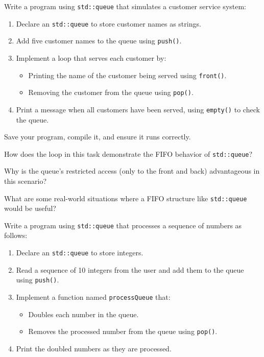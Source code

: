 \begin{challenge}
    \begin{task}
        Write a program using \texttt{std::queue} that simulates a customer service system:
        \begin{enumerate}
            \item Declare an \texttt{std::queue} to store customer names as strings.
            \item Add five customer names to the queue using \texttt{push()}.
            \item Implement a loop that serves each customer by:
                \begin{itemize}
                    \item Printing the name of the customer being served using \texttt{front()}.
                    \item Removing the customer from the queue using \texttt{pop()}.
                \end{itemize}
            \item Print a message when all customers have been served, using \texttt{empty()} to check the queue.
        \end{enumerate}

        Save your program, compile it, and ensure it runs correctly.

        \begin{questions}
            \item How does the loop in this task demonstrate the FIFO behavior of \texttt{std::queue}?
            \item Why is the queue’s restricted access (only to the front and back) advantageous in this scenario?
            \item What are some real-world situations where a FIFO structure like \texttt{std::queue} would be useful?
        \end{questions}
    \end{task}

    \begin{task}
        Write a program using \texttt{std::queue} that processes a sequence of numbers as follows:
        \begin{enumerate}
            \item Declare an \texttt{std::queue} to store integers.
            \item Read a sequence of 10 integers from the user and add them to the queue using \texttt{push()}.
            \item Implement a function named \texttt{processQueue} that:
                \begin{itemize}
                    \item Doubles each number in the queue.
                    \item Removes the processed number from the queue using \texttt{pop()}.
                \end{itemize}
            \item Print the doubled numbers as they are processed.
        \end{enumerate}


\end{task}
\end{challenge}

